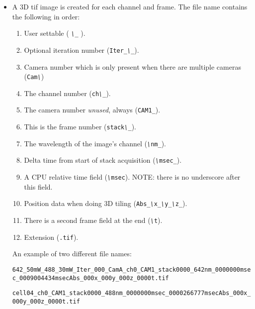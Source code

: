 \documentclass[letter,11pt]{article}
\newcommand{\regex}[1]{\textit{\small{\textbackslash}\!{#1}}}
\begin{document}
\begin{itemize}
		\item A 3D tif image is created for each channel and frame.
			The file name contains the following in order:
			\begin{enumerate}
				\item User settable ( \texttt{\regex{w+}\_} ).
				\item Optional iteration number (\texttt{Iter\_\regex{d+}\_}).
				\item Camera number which is only present when there are multiple cameras (\texttt{Cam\regex{D}})
				\item The channel number (\texttt{ch\regex{d}\_}).
				\item The camera number \textit{unused}, always (\texttt{CAM1\_}).
				\item This is the frame number (\texttt{stack\regex{d+}\_}).
				\item The wavelength of the image's channel (\texttt{\regex{d+}nm\_}).
				\item Delta time from start of stack acquisition (\texttt{\regex{d+}msec\_}).
				\item A CPU relative time field (\texttt{\regex{d+}msec}).
					NOTE: there is no underscore after this field.
				\item Position data when doing 3D tiling (\texttt{Abs\_\regex{d+}x\_\regex{d+}y\_\regex{d+}z\_}).
				\item There is a second frame field at the end (\texttt{\regex{d+}t}).
				\item Extension (\texttt{.tif}).
			\end{enumerate}
			An example of two different file names:

			\scriptsize\texttt{642\_50mW\_488\_30mW\_Iter\_000\_CamA\_ch0\_CAM1\_stack0000\_642nm\_0000000msec\_0009004434msecAbs\_000x\_000y\_000z\_0000t.tif}

			\scriptsize\texttt{cell04\_ch0\_CAM1\_stack0000\_488nm\_0000000msec\_0000266777msecAbs\_000x\_000y\_000z\_0000t.tif}

	\end{itemize}
\end{document}
